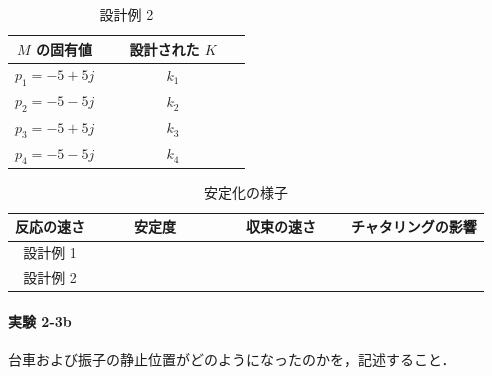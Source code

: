 \begin{table}[h]
  \centering
  \caption{設計例 2}
  \label{tab:design_example_2}
  \begin{tabular}{|c|c|}
    \hline
    \( M \) の固有値    & 設計された \( K \)                            \\
    \hline
    \( p_1 = -5 + 5j \) & \( k_1 \) {\large\textbf{　　　　　　　　}}   \\
    \( p_2 = -5 - 5j \) & \( k_2 \)   {\large\textbf{　　　　　　　　}} \\
    \( p_3 = -5 + 5j \) & \( k_3 \)   {\large\textbf{　　　　　　　　}} \\
    \( p_4 = -5 - 5j \) & \( k_4 \)   {\large\textbf{　　　　　　　　}} \\
    \hline
  \end{tabular}
\end{table}

\begin{table}[h]
  \centering
  \caption{安定化の様子}
  \label{tab:stabilization_observation}
  \begin{tabular}{|c|c|c|c|}
    \hline
    反応の速さ & 安定度                            & 収束の速さ                        & チャタリングの影響                \\
    \hline
    設計例 1   & {\large\textbf{　　　　　　　　}} & {\large\textbf{　　　　　　　　}} & {\large\textbf{　　　　　　　　}} \\
    設計例 2   & {\large\textbf{　　　　　　　　}} & {\large\textbf{　　　　　　　　}} & {\large\textbf{　　　　　　　　}} \\
    \hline
  \end{tabular}
\end{table}

\paragraph{実験 2-3b}
台車および振子の静止位置がどのようになったのかを，記述すること．

